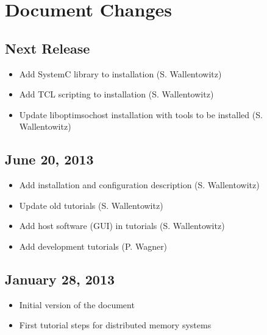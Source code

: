 \section*{Document Changes}


\subsection*{Next Release} %
\begin{itemize}
\item Add SystemC library to installation (S. Wallentowitz)
\item Add TCL scripting to installation (S. Wallentowitz)
\item Update liboptimsochost installation with tools to be installed
  (S. Wallentowitz)
\end{itemize}

\subsection*{June 20, 2013}
\begin{itemize}
\item Add installation and configuration description (S. Wallentowitz)
\item Update old tutorials (S. Wallentowitz)
\item Add host software (GUI) in tutorials (S. Wallentowitz)
\item Add development tutorials (P. Wagner) 
\end{itemize}

\subsection*{January 28, 2013}
\begin{itemize}
\item Initial version of the document
\item First tutorial steps for distributed memory systems
\end{itemize}